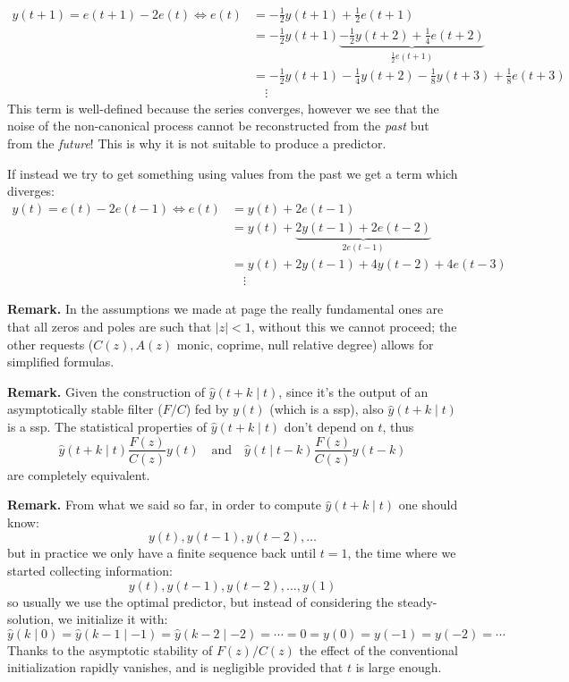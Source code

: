 \begin{obs}
\begin{align*}
	y(t+1)=e(t+1)-2e(t) \iff e(t)&=-\frac{1}{2} y(t+1)+\frac{1}{2} e(t+1)\\
	&= -\frac{1}{2} y(t+1)\underbrace{-\frac{1}{2} y(t+2)+\frac{1}{4}e(t+2)}_{\frac{1}{2} e(t+1)}\\
	&= -\frac{1}{2} y(t+1)-\frac{1}{4}y(t+2)-\frac{1}{8}y(t+3)+\frac{1}{8}e(t+3)\\
	&\quad\vdots
\end{align*}
This term is well-defined because the series converges, however we see that the noise of the non-canonical process cannot be reconstructed from the \emph{past} but from the \emph{future}! This is why it is not suitable to produce a predictor.

If instead we try to get something using values from the past we get a term which diverges:
\begin{align*}
	y(t)=e(t)-2e(t-1) \iff e(t)&=y(t)+2e(t-1)\\
	&=y(t)+\underbrace{2y(t-1)+2e(t-2)}_{2e(t-1)}\\
	&=y(t)+2y(t-1)+4y(t-2)+4e(t-3)\\
	&\quad\vdots
\end{align*}
\end{obs}

\textbf{Remark.}
In the assumptions we made at page \pageref{assumptions-prediction-theory} the really fundamental ones are that all zeros and poles are such that $|z|<1$, without this we cannot proceed; the other requests ($C(z),A(z)$ monic, coprime, null relative degree) allows for simplified formulas.

\textbf{Remark.}
Given the construction of $\hat y(t+k\mid t)$, since it's the output of an asymptotically stable filter ($F/C$) fed by $y(t)$ (which is a \gls{ssp}), also $\hat y(t+k\mid t)$ is a \gls{ssp}. The statistical properties of $\hat y(t+k\mid t)$ don't depend on $t$, thus
\[
	\hat y(t+k\mid t)\frac{F(z)}{C(z)}y(t) \quad \text{and} \quad \hat y(t\mid t-k)\frac{F(z)}{C(z)}y(t-k)
\]
are completely equivalent.

\textbf{Remark.}
From what we said so far, in order to compute $\hat y(t+k\mid t)$ one should know:
\[
	y(t),y(t-1),y(t-2),\ldots
\]
but in practice we only have a finite sequence back until $t=1$, the time where we started collecting information:
\[
	y(t),y(t-1),y(t-2),\ldots,y(1)
\]
so usually we use the optimal predictor, but instead of considering the steady-solution, we initialize it with:
\[
	\hat y(k\mid 0) = \hat y(k-1\mid -1) = \hat y(k-2\mid -2) = \cdots = 0 = y(0) = y(-1) = y(-2) = \cdots
\]
Thanks to the asymptotic stability of $F(z)/C(z)$ the effect of the conventional initialization rapidly vanishes, and is negligible provided that $t$ is large enough.

